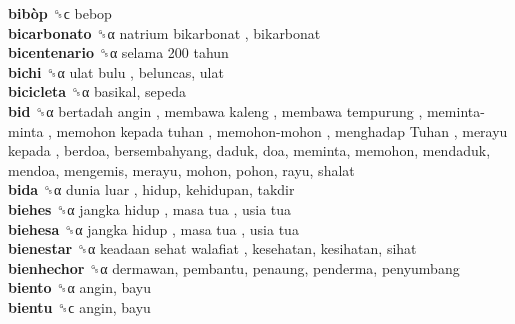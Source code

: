 \textbf{bibòp} ␝ϲ  bebop  \\
\textbf{bicarbonato} ␝α   natrium bikarbonat , bikarbonat  \\
\textbf{bicentenario} ␝α   selama 200 tahun   \\
\textbf{bichi} ␝α   ulat bulu , beluncas, ulat  \\
\textbf{bicicleta} ␝α  basikal, sepeda  \\
\textbf{bid} ␝α   bertadah angin ,  membawa kaleng ,  membawa tempurung ,  meminta-minta ,  memohon kepada tuhan ,  memohon-mohon ,  menghadap Tuhan ,  merayu kepada , berdoa, bersembahyang, daduk, doa, meminta, memohon, mendaduk, mendoa, mengemis, merayu, mohon, pohon, rayu, shalat  \\
\textbf{bida} ␝α   dunia luar , hidup, kehidupan, takdir  \\
\textbf{biehes} ␝α   jangka hidup ,  masa tua ,  usia tua   \\
\textbf{biehesa} ␝α   jangka hidup ,  masa tua ,  usia tua   \\
\textbf{bienestar} ␝α   keadaan sehat walafiat , kesehatan, kesihatan, sihat  \\
\textbf{bienhechor} ␝α  dermawan, pembantu, penaung, penderma, penyumbang  \\
\textbf{biento} ␝α  angin, bayu  \\
\textbf{bientu} ␝ϲ  angin, bayu  \\
